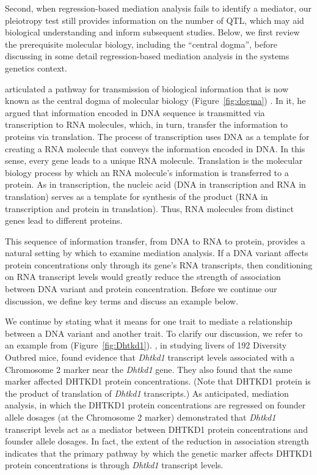 \documentclass[oneside]{book}\usepackage[]{graphicx}\usepackage[]{color}
\begin{document}
\begin{titlepage}
Second, when regression-based mediation analysis fails to identify a mediator, our
pleiotropy test still provides information on the number of QTL, which may aid biological
understanding and inform subsequent studies. Below, we first review the prerequisite
molecular biology, including the ``central dogma'', before discussing in some detail
regression-based mediation analysis in the systems genetics context.

\citet{crick1958protein} articulated a pathway for transmission of biological information
that is now known as the central dogma of molecular biology (Figure~\ref{fig:dogma})
\citep{crick1970central}.
In it, he argued that information encoded in DNA sequence is transmitted via transcription
to
RNA molecules, which, in turn, transfer the information to proteins via translation.
The process of transcription uses DNA as a template for creating a RNA molecule that
conveys the information encoded in DNA.
In this sense, every gene leads to a unique RNA molecule.
Translation is the molecular biology process by which an RNA molecule's information is
transferred to a protein.
As in transcription, the nucleic acid (DNA in transcription and RNA in translation) serves
as a template for synthesis of the product (RNA in transcription and protein in translation).
Thus, RNA molecules from distinct genes lead to different proteins.

This sequence of information transfer, from DNA to RNA to protein, provides a natural
setting by which to examine mediation analysis. If a DNA variant affects protein
concentrations only through its gene's RNA transcripts, then conditioning on RNA transcript
levels would greatly reduce the strength of association between DNA variant and protein
concentration. Before we continue our discussion, we define key terms and discuss an
example below.

We continue by stating what it means for one trait to mediate a relationship between a
DNA variant and another trait. To clarify our discussion, we refer to an example from
\citet{chick2016defining} (Figure~\ref{fig:Dhtkd1}). \citet{chick2016defining}, in
studying livers of 192 Diversity Outbred mice, found evidence that \emph{Dhtkd1}
transcript levels associated with a Chromosome 2 marker near the \emph{Dhtkd1} gene.
They also found that
the same marker affected DHTKD1 protein concentrations. (Note that DHTKD1 protein is the
product of translation of \emph{Dhtkd1} transcripts.)
As anticipated, mediation analysis, in which the DHTKD1 protein concentrations are
regressed on founder allele dosages (at the Chromosome 2 marker) demonstrated that
\emph{Dhtkd1} transcript levels act as a mediator between DHTKD1 protein concentrations
and founder allele dosages. In fact, the extent of the reduction in association
strength indicates that the primary pathway by which the genetic marker affects DHTKD1
protein concentrations is through \emph{Dhtkd1} transcript levels.


\end{titlepage}
\end{document}
